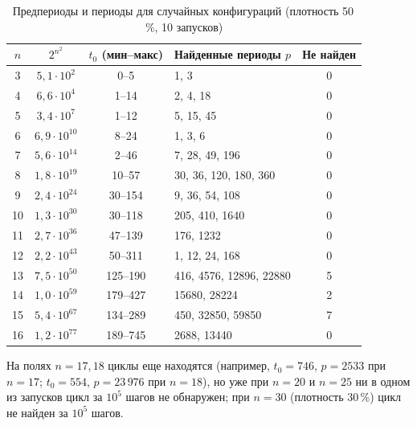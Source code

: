 \begin{table}[H]
	\centering
	\caption{Предпериоды и периоды для случайных конфигураций (плотность 50\,\%, 10 запусков)}
	\label{tab:periods}
	\begin{tabular}{|c|c|c|l|c|}
		\hline
		$n$ & $2^{n^2}$ & $t_0$ (мин--макс) & Найденные периоды $p$ & Не найден \\
		\hline
		3  & $5{,}1 \cdot 10^{2}$  & 0--5     & 1, 3                  & 0 \\
		4  & $6{,}6 \cdot 10^{4}$  & 1--14    & 2, 4, 18              & 0 \\
		5  & $3{,}4 \cdot 10^{7}$  & 1--12    & 5, 15, 45             & 0 \\
		6  & $6{,}9 \cdot 10^{10}$ & 8--24    & 1, 3, 6               & 0 \\
		7  & $5{,}6 \cdot 10^{14}$ & 2--46    & 7, 28, 49, 196        & 0 \\
		8  & $1{,}8 \cdot 10^{19}$ & 10--57   & 30, 36, 120, 180, 360 & 0 \\
		9  & $2{,}4 \cdot 10^{24}$ & 30--154  & 9, 36, 54, 108        & 0 \\
		10 & $1{,}3 \cdot 10^{30}$ & 30--118  & 205, 410, 1640        & 0 \\
		11 & $2{,}7 \cdot 10^{36}$ & 47--139  & 176, 1232             & 0 \\
		12 & $2{,}2 \cdot 10^{43}$ & 50--311  & 1, 12, 24, 168        & 0 \\
		13 & $7{,}5 \cdot 10^{50}$ & 125--190 & 416, 4576, 12896, 22880 & 5 \\
		14 & $1{,}0 \cdot 10^{59}$ & 179--427 & 15680, 28224          & 2 \\
		15 & $5{,}4 \cdot 10^{67}$ & 134--289 & 450, 32850, 59850     & 7 \\
		16 & $1{,}2 \cdot 10^{77}$ & 189--745 & 2688, 13440           & 0 \\
		\hline
	\end{tabular}
\end{table}

На полях $n = 17, 18$ циклы еще находятся (например, $t_0 = 746$, $p = 2533$ при $n = 17$; $t_0 = 554$, $p = 23\,976$ при $n = 18$), но уже при $n = 20$ и $n = 25$ ни в одном из запусков цикл за $10^5$ шагов не обнаружен; при $n = 30$ (плотность 30\,\%) цикл не найден за $10^5$ шагов.


